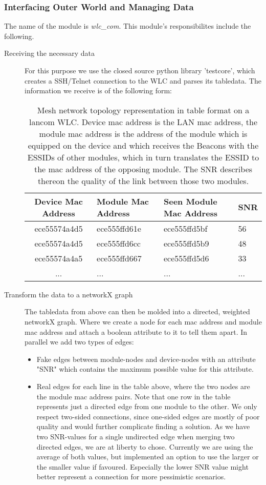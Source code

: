   \subsubsection{Interfacing Outer World and Managing Data}
    The name of the module is \textit{wlc\_com}. This module's responsibilites include the following.
    \begin{description}
    \item[Receiving the necessary data]
      For this purpose we use the closed source python library 'testcore', which creates a SSH/Telnet connection to the WLC and parses its tabledata.
      The information we receive is of the following form:
      \begin{table}[p]
	\begin{tabular}{clll}
	  Device Mac Address & Module Mac Address & Seen Module Mac Address & \ac{SNR}\\ \hline
	  ece55574a4d5 & ece555ffd61e & ece555ffd5bf & 56 \\
	  ece55574a4d5 & ece555ffd6cc & ece555ffd5b9 & 48 \\
	  ece55574a4a5 & ece555ffd667 & ece555ffd5d6 & 33 \\
	  ... & ... & ... & ...
	\end{tabular}
	\caption{Mesh network topology representation in table format on a lancom WLC. Device mac address is the LAN mac address, the module mac address is
	the address of the module which is equipped on the device and which receives the Beacons with the ESSIDs of other modules, which in turn translates
	the ESSID to the mac address of the opposing module. The \ac{SNR} describes thereon the quality of the link between those two modules.}
	\label{tab:wlc}
      \end{table}
      
      \item [Transform the data to a networkX graph]
	The tabledata from above can then be molded into a directed, weighted networkX graph. Where we create a node for each mac address and module mac address and attach a boolean
	attribute to it to tell them apart. 
	In parallel we add two types of edges:
      
	\begin{itemize}
	  \item Fake edges between module-nodes and device-nodes with an attribute "SNR" which contains the maximum possible value for this attribute.
	  
	  \item Real edges for each line in the table above, where the two nodes are the module mac address pairs. 
	    Note that one row in the table represents just a directed edge from one module to the other. We only respect two-sided connections,
	    since one-sided edges are mostly of poor quality and would further complicate finding a solution.
	    As we have two SNR-values for a single undirected edge when merging two directed edges, we are at liberty to chose.
	    Currently we are using the average of both values, but implemented an option to use the larger or the smaller value if favoured.
	    Especially the lower SNR value might better represent a connection for more pessimistic scenarios.
	\end{itemize}
      

\end{description}
